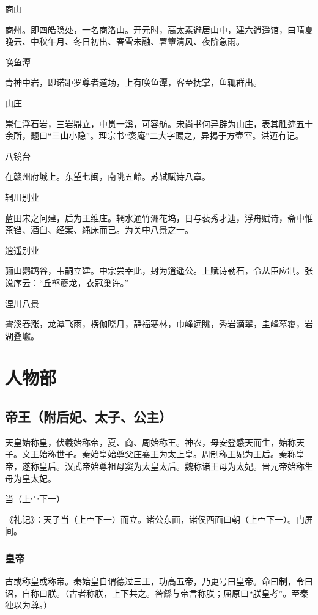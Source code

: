 \documentclass[a4paper,12pt,UTF8,twoside]{ctexbook}
\begin{document}
商山

商州。即四皓隐处，一名商洛山。开元时，高太素避居山中，建六逍遥馆，曰晴夏晚云、中秋午月、冬日初出、春雪未融、署簟清风、夜阶急雨。

唤鱼潭

青神中岩，即诺距罗尊者道场，上有唤鱼潭，客至抚掌，鱼辄群出。

山庄

崇仁浮石岩，三岩鼎立，中贯一溪，可容舫。宋尚书何异辟为山庄，表其胜迹五十余所，题曰“三山小隐”。理宗书“衮庵”二大字赐之，异揭于方壶室。洪迈有记。

八镜台

在赣州府城上。东望七闽，南眺五岭。苏轼赋诗八章。

辋川别业

蓝田宋之问建，后为王维庄。辋水通竹洲花坞，日与裴秀才迪，浮舟赋诗，斋中惟茶铛、酒臼、经案、绳床而已。为关中八景之一。

逍遥别业

骊山鹦鹉谷，韦嗣立建。中宗尝幸此，封为逍遥公。上赋诗勒石，令从臣应制。张说序云：“丘壑夔龙，衣冠巢许。”

涅川八景

霅溪春涨，龙潭飞雨，楞伽晓月，静福寒林，巾峰远眺，秀岩滴翠，圭峰墓霭，岩湖叠巘。



    \part{人物部}
    
    \chapter{帝王（附后妃、太子、公主）}
    
    天皇始称皇，伏羲始称帝，夏、商、周始称王。神农，母安登感天而生，始称天子。文王始称世子。秦始皇始尊父庄襄王为太上皇。周制称王妃为王后。秦称皇帝，遂称皇后。汉武帝始尊祖母窦为太皇太后。魏称诸王母为太妃。晋元帝始称生母为皇太妃。
    
    当（上宀下一）
    
    《礼记》：天子当（上宀下一）而立。诸公东面，诸侯西面曰朝（上宀下一）。门屏间。
    
    \section{皇帝}
    
    古或称皇或称帝。秦始皇自谓德过三王，功高五帝，乃更号曰皇帝。命曰制，令曰诏，自称曰朕。（古者称朕，上下共之。咎繇与帝言称朕；屈原曰“朕皇考”。至秦独以为尊。）
    
\end{document}
